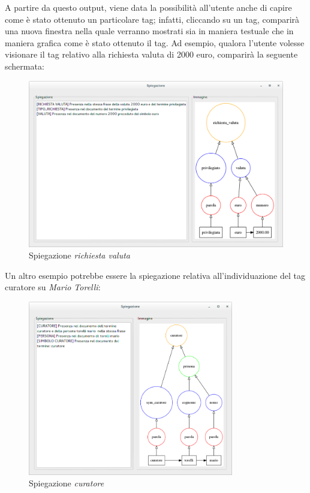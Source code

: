 A partire da questo output, viene data la possibilità all'utente anche di capire come è stato ottenuto un particolare tag; infatti, cliccando su un tag, comparirà una nuova finestra nella quale verranno mostrati sia in maniera testuale che in maniera grafica come è stato ottenuto il tag.
Ad esempio, qualora l'utente volesse visionare il tag relativo alla richiesta valuta di 2000 euro, comparirà la seguente schermata:

\begin{figure}[H]
	\centering
	\includegraphics[width=1.1\textwidth]{img/interfaces/java-richiestavaluta.png}
	\caption[Schermata Java explain richiesta valuta]{Spiegazione \emph{richiesta valuta}}
	\label{java-richiestavaluta}
\end{figure}

Un altro esempio potrebbe essere la spiegazione relativa all'individuazione del tag curatore su \emph{Mario Torelli}:

\begin{figure}[H]
	\centering
	\includegraphics[width=0.8\textwidth]{img/interfaces/java-curatore.png}
	\caption[Schermata Java explain curatore]{Spiegazione \emph{curatore}}
	\label{java-curatore}
\end{figure}

